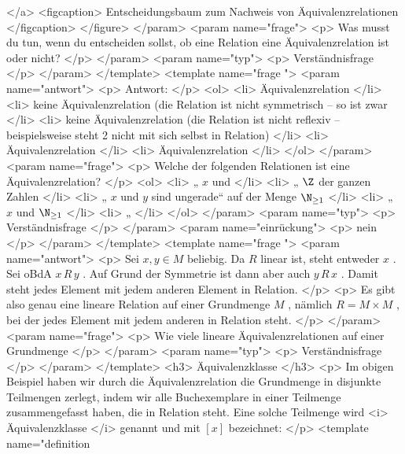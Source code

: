      </a>
     <figcaption>
      Entscheidungsbaum zum Nachweis von Äquivalenzrelationen
     </figcaption>
    </figure>
   </param>
   <param name="frage">
    <p>
     Was musst du tun, wenn du entscheiden sollst, ob eine Relation eine Äquivalenzrelation ist oder nicht?
    </p>
   </param>
   <param name="typ">
    <p>
     Verständnisfrage
    </p>
   </param>
  </template>
  <template name="frage
 ">
   <param name="antwort">
    <p>
     Antwort:
    </p>
    <ol>
     <li>
      Äquivalenzrelation
     </li>
     <li>
      keine Äquivalenzrelation (die Relation ist nicht symmetrisch – so ist zwar
     </li>
     <li>
      keine Äquivalenzrelation (die Relation ist nicht reflexiv – beispielsweise steht 2 nicht mit sich selbst in Relation)
     </li>
     <li>
      Äquivalenzrelation
     </li>
     <li>
      Äquivalenzrelation
     </li>
    </ol>
   </param>
   <param name="frage">
    <p>
     Welche der folgenden Relationen ist eine Äquivalenzrelation?
    </p>
    <ol>
     <li>
      „
      $x$
      und
     </li>
     <li>
      „
      $\Z$
      der ganzen Zahlen
     </li>
     <li>
      „
      $x$
      und
      $y$
      sind ungerade“ auf der Menge
      $\N_{\ge1}$
     </li>
     <li>
      „
      $x$
      und
      $\N_{\ge1}$
     </li>
     <li>
      „
     </li>
    </ol>
   </param>
   <param name="typ">
    <p>
     Verständnisfrage
    </p>
   </param>
   <param name="einrückung">
    <p>
     nein
    </p>
   </param>
  </template>
  <template name="frage
 ">
   <param name="antwort">
    <p>
     Sei
     $x,y\in M$
     beliebig. Da
     $R$
     linear ist, steht entweder
     $x$
     . Sei oBdA
     $x\,R\,y$
     . Auf Grund der Symmetrie ist dann aber auch
     $y\,R\,x$
     . Damit steht jedes Element mit jedem anderen Element in Relation.
    </p>
    <p>
     Es gibt also genau eine lineare Relation auf einer Grundmenge
     $M$
     , nämlich
     $R=M\times M$
     , bei der jedes Element mit jedem anderen in Relation steht.
    </p>
   </param>
   <param name="frage">
    <p>
     Wie viele lineare Äquivalenzrelationen auf einer Grundmenge
    </p>
   </param>
   <param name="typ">
    <p>
     Verständnisfrage
    </p>
   </param>
  </template>
  <h3>
   Äquivalenzklasse
  </h3>
  <p>
   Im obigen Beispiel haben wir durch die Äquivalenzrelation die Grundmenge in disjunkte Teilmengen zerlegt, indem wir alle Buchexemplare in einer Teilmenge zusammengefasst haben, die in Relation steht. Eine solche Teilmenge wird
   <i>
    Äquivalenzklasse
   </i>
   genannt und mit
   $[x]$
   bezeichnet:
  </p>
  <template name="definition
